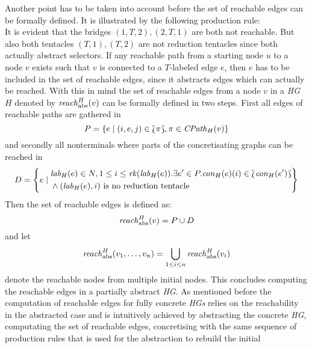 	Another point has to be taken into account before the set of reachable edges
	can be formally defined. It is illustrated by the following production rule:
	\begin{equation*}
		\label{eq:reachex}
		
	\end{equation*}
	It is evident that the bridges $(1,T,2), (2,T,1)$ are both not reachable.
	But also both tentacles $(T,1), (T,2)$ are not reduction tentacles since
	both actually abstract selectors. If any reachable path from a starting node
	$u$ to a node $v$ exists such that $v$ is connected to a $T$-labeled edge
	$e$, then $e$ has to be included in the set of reachable edges, since it
	abstracts edges which can actually be reached.
	With this in mind the set of reachable edges from a node $v$ in a
	\emph{\ac{HG}} $H$ denoted by $\mathit{reach}_{\text{abs}}^{H}(v)$ can be formally
	defined in two steps. First all edges of reachable paths are gathered in
	\begin{equation*}
		P = \{e \mid (i, e, j)\in\Lbag\pi\Rbag,\pi\in\mathit{CPath}_{H}(v)\}
	\end{equation*}
	and secondly all nonterminals where parts of the concretisating graphs can
	be reached in
	\begin{equation*}
		D = 
		\left\{e\mid
			\begin{aligned}
				&\mathit{lab}_{H}(e)\in N, 1\leq i\leq \mathit{rk}(\mathit{lab}_{H}(e)).
				\exists e'\in P.\mathit{con}_{H}(e)(i)\in\Lbag\mathit{con}_{H}(e')\Rbag\\
				&\land (\mathit{lab}_{H}(e),i)\text{ is no reduction tentacle}
			\end{aligned}
		\right\}
	\end{equation*}
	Then the set of reachable edges is defined as:
	\begin{equation*}
		\mathit{reach}_{\text{abs}}^{H}(v) = P\cup D
	\end{equation*}
	and let
	\begin{equation*}
		\mathit{reach}_{\text{abs}}^{H}(v_1,\dots,v_n) = \bigcup_{1\leq i\leq n}
		\mathit{reach}_{\text{abs}}^{H}(v_i)
	\end{equation*}
	denote the reachable nodes from multiple initial nodes.
	This concludes computing the reachable edges in a partially abstract
	\emph{\ac{HG}}. As mentioned before the computation of reachable edges for
	fully concrete \emph{\acp{HG}} relies on the reachability in the abstracted
	case and is intuitively achieved by abstracting the concrete \emph{\ac{HG}},
	computating the set of reachable edges, concretising with the same sequence
	of production rules that is used for the abstraction to rebuild the initial
